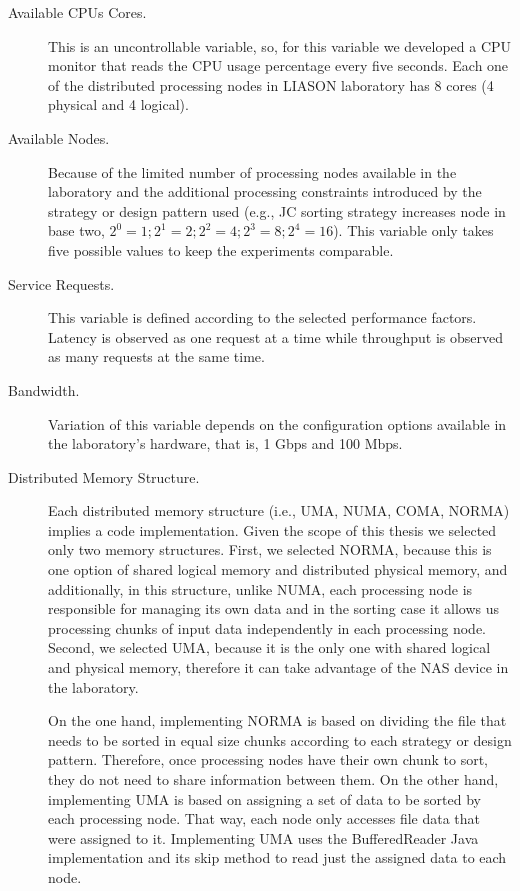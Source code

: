 \begin{description}
	\item [Available CPUs Cores.] This is an uncontrollable variable, so, for this variable we developed a CPU monitor that reads the CPU usage percentage every five seconds. Each one of the distributed processing nodes in LIASON laboratory has 8 cores (4 physical and 4 logical).
	\item [Available Nodes.] Because of the limited number of processing nodes available in the laboratory and the additional processing constraints introduced by the strategy or design pattern used (e.g., JC sorting strategy increases node in base two, $2^{0}=1 ; 2^{1}=2; 2^{2}=4; 2^{3}=8; 2^{4}=16$). This variable only takes five possible values to keep the experiments comparable.
	\item [Service Requests.] This variable is defined according to the selected performance factors. Latency is observed as one request at a time while throughput is observed as many requests at the same time.
	\item [Bandwidth.] Variation of this variable depends on the configuration options available in the laboratory's hardware, that is, 1 Gbps and 100 Mbps.
	\item [Distributed Memory Structure.] Each distributed memory structure (i.e., UMA, NUMA, COMA, NORMA) implies a code implementation. Given the scope of this thesis we selected only two memory structures. First, we selected NORMA, because this is one option of shared logical memory and distributed physical memory, and additionally, in this structure, unlike NUMA, each processing node is responsible for managing its own data and in the sorting case it allows us processing chunks of input data independently in each processing node. Second, we selected UMA, because it is the only one with shared logical and physical memory, therefore it can take advantage of the NAS device in the laboratory.
	
	On the one hand, implementing NORMA is based on dividing the file that needs to be sorted in equal size chunks according to each strategy or design pattern. Therefore, once processing nodes have their own chunk to sort, they do not need to share information between them. On the other hand, implementing UMA is based on assigning a set of data to be sorted by each processing node. That way, each node only accesses file data that were assigned to it. Implementing UMA uses the BufferedReader Java implementation and its skip method to read just the assigned data to each node.
	

\end{description}
